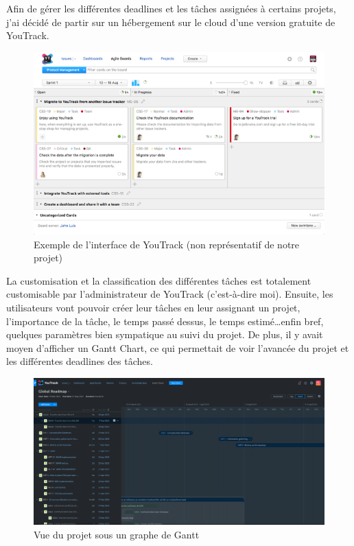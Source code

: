 Afin de gérer les différentes deadlines et les tâches assignées à certains projets, j'ai décidé de partir sur un hébergement sur le cloud d'une version gratuite de YouTrack.

\begin{figure}[H]
    \centering
    \includegraphics[width=\textwidth]{./img/youtrack.png}
    \caption{Exemple de l'interface de YouTrack (non représentatif de notre projet)}
    \label{fig:youtrack}
\end{figure}

La customisation et la classification des différentes tâches est totalement customisable par l'administrateur de YouTrack (c'est-à-dire moi). Ensuite, les utilisateurs vont pouvoir créer leur tâches en leur assignant un projet, l'importance de la tâche, le temps passé dessus, le temps estimé\dots enfin bref, quelques paramètres bien sympatique au suivi du projet. De plus, il y avait moyen d'afficher un Gantt Chart, ce qui permettait de voir l'avancée du projet et les différentes deadlines des tâches.

\begin{figure}[H]
    \centering
    \includegraphics[width=\textwidth]{./img/youtrack-gantt.png}
    \caption{Vue du projet sous un graphe de Gantt}
    \label{fig:youtrack-gantt}
\end{figure}

